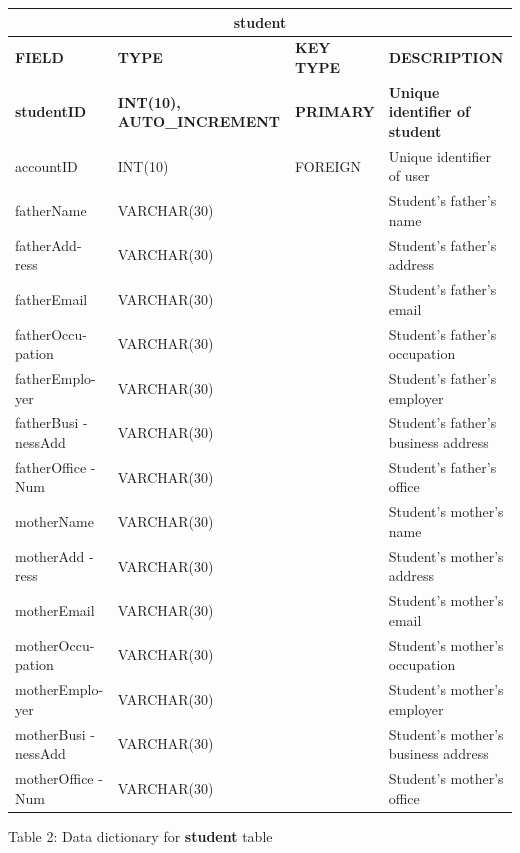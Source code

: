\documentclass[11pt,a4paper,titlepage]{article}
\begin{document}
\vspace{1cm}
\begin{longtable}{ |p{2.5cm}|p{4.5cm}|p{2.5cm}|p{3cm}|  }
    \hline
    \multicolumn{4}{|c|}{\textbf{student}} \\
    \hline
    \textbf{FIELD}&\textbf{TYPE}&\textbf{KEY TYPE}&\textbf{DESCRIPTION}\\
    \hline
    \textbf{studentID}   & \textbf{INT(10), AUTO\_INCREMENT}  & \textbf{PRIMARY} & \textbf{Unique identifier of student}\\ \hline
    accountID& INT(10) & FOREIGN & Unique identifier of user \\ \hline
    fatherName& VARCHAR(30) &  & Student's father's name \\ \hline
    fatherAdd- ress& VARCHAR(30) &  & Student's father's address \\ \hline
    fatherEmail& VARCHAR(30) &  & Student's father's email \\ \hline
    fatherOccu- pation& VARCHAR(30) &  & Student's father's occupation \\ \hline
    fatherEmplo- yer& VARCHAR(30) &  & Student's father's employer \\ \hline
    fatherBusi -nessAdd& VARCHAR(30) &  & Student's father's business address \\ \hline
    fatherOffice -Num& VARCHAR(30) &  & Student's father's office \\ \hline
    motherName& VARCHAR(30) &  & Student's mother's name \\ \hline
    motherAdd -ress& VARCHAR(30) &  & Student's mother's address \\ \hline
    motherEmail& VARCHAR(30) &  & Student's mother's email \\ \hline
    motherOccu- pation& VARCHAR(30) &  & Student's mother's occupation \\ \hline
    motherEmplo- yer& VARCHAR(30) &  & Student's mother's employer \\ \hline
    motherBusi -nessAdd& VARCHAR(30) &  & Student's mother's business address \\ \hline
    motherOffice -Num& VARCHAR(30) &  & Student's mother's office \\ \hline
\end{longtable}

\vspace{.5cm}
\begin{center}
    Table 2: Data dictionary for \textbf{student} table
\end{center}
\end{document}
